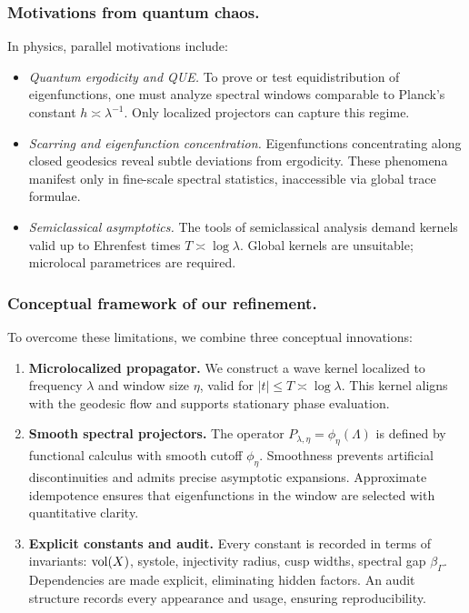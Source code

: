 \subsubsection*{Motivations from quantum chaos.}
In physics, parallel motivations include:
\begin{itemize}
  \item \emph{Quantum ergodicity and QUE.}  
  To prove or test equidistribution of eigenfunctions, one must analyze spectral
  windows comparable to Planck’s constant $h\asymp\lambda^{-1}$.
  Only localized projectors can capture this regime.

  \item \emph{Scarring and eigenfunction concentration.}  
  Eigenfunctions concentrating along closed geodesics reveal subtle deviations from
  ergodicity. These phenomena manifest only in fine-scale spectral statistics,
  inaccessible via global trace formulae.

  \item \emph{Semiclassical asymptotics.}  
  The tools of semiclassical analysis demand kernels valid up to Ehrenfest times
  $T\asymp\log\lambda$. Global kernels are unsuitable; microlocal parametrices are required.
\end{itemize}

\subsubsection*{Conceptual framework of our refinement.}
To overcome these limitations, we combine three conceptual innovations:

\begin{enumerate}[label=\Alph*.]
  \item \textbf{Microlocalized propagator.}  
  We construct a wave kernel localized to frequency $\lambda$ and window size $\eta$,
  valid for $|t|\le T\asymp\log\lambda$. This kernel aligns with the geodesic flow
  and supports stationary phase evaluation.

  \item \textbf{Smooth spectral projectors.}  
  The operator $P_{\lambda,\eta}=\phi_\eta(\Lambda)$ is defined by functional calculus
  with smooth cutoff $\phi_\eta$. Smoothness prevents artificial discontinuities and
  admits precise asymptotic expansions. Approximate idempotence ensures that
  eigenfunctions in the window are selected with quantitative clarity.

  \item \textbf{Explicit constants and audit.}  
  Every constant is recorded in terms of invariants: $\operatorname{vol}(X)$, systole, injectivity
  radius, cusp widths, spectral gap $\beta_\Gamma$. Dependencies are made explicit,
  eliminating hidden factors. An audit structure records every appearance and usage,
  ensuring reproducibility.
\end{enumerate}


